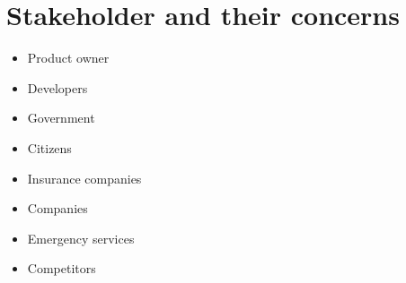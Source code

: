 \section{Stakeholder and their concerns}
\begin{itemize}
	\item Product owner
	\item Developers

	\item Government
	\item Citizens
	\item Insurance companies
	\item Companies
	\item Emergency services
	
	\item Competitors
\end{itemize}

